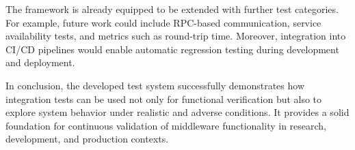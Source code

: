 \vspace{1em}
The framework is already equipped to be extended with further test categories. For example, future work could include RPC-based communication, service availability tests, and metrics such as round-trip time. Moreover, integration into CI/CD pipelines would enable automatic regression testing during development and deployment.

\vspace{1em}
In conclusion, the developed test system successfully demonstrates how integration tests can be used not only for functional verification but also to explore system behavior under realistic and adverse conditions. It provides a solid foundation for continuous validation of middleware functionality in research, development, and production contexts.


